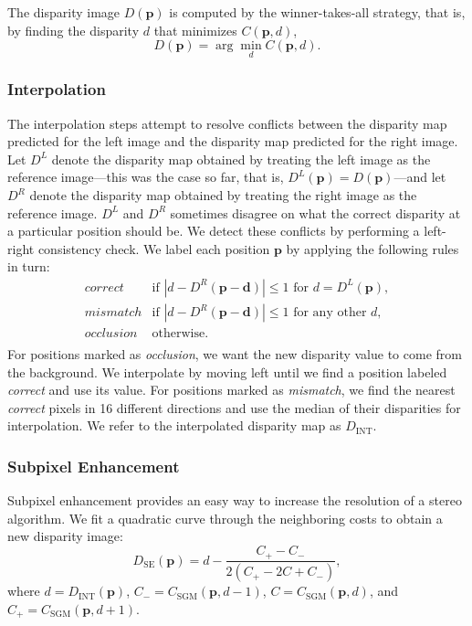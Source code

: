\documentclass[twoside,11pt]{article}
\begin{document}
The disparity image $D(\mathbf{p})$ is computed by the winner-takes-all
strategy, that is, by finding the disparity $d$ that minimizes $C(\mathbf{p},
d)$,
%
\begin{equation*}
D(\mathbf{p}) = \arg\!\min_d C(\mathbf{p}, d).
\end{equation*}

\subsubsection{Interpolation}

The interpolation steps attempt to resolve conflicts between the disparity
map predicted for the left image and the disparity map predicted for the right
image. Let $D^L$ denote the disparity map obtained by treating the left image
as the reference image---this was the case so far, that is, $D^L(\mathbf{p}) =
D(\mathbf{p})$---and let $D^R$ denote the disparity map obtained by treating
the right image as the reference image. $D^L$ and $D^R$ sometimes disagree on
what the correct disparity at a particular position should be. We detect these
conflicts by performing a left-right consistency check. We label each
position $\mathbf{p}$ by applying the following rules in turn:
%
\[ \begin{array}{ll} 
correct & \text{if $|d - D^R(\mathbf{p}-\mathbf{d})| \leq 1$ for $d = D^L(\mathbf{p})$}, \\ 
mismatch & \text{if $|d - D^R(\mathbf{p}-\mathbf{d})| \leq 1$ for any other $d$}, \\ 
occlusion & \text{otherwise}. \\ 
\end{array} \]
%
For positions marked as \emph{occlusion}, we want the new disparity value to
come from the background. We interpolate by moving left until we find a
position labeled \emph{correct} and use its value. For positions marked as
\emph{mismatch}, we find the nearest \emph{correct} pixels in 16 different
directions and use the median of their disparities for interpolation. 
We refer to the interpolated disparity map as $D_{\text{INT}}$.

\subsubsection{Subpixel Enhancement}

Subpixel enhancement provides an easy way to increase the resolution of a
stereo algorithm. We fit a quadratic curve through the neighboring costs to
obtain a new disparity image:
%
\begin{equation*}
D_{\text{SE}}(\mathbf{p}) = d - \frac {C_+ - C_-} {2 (C_+ - 2 C + C_-)},
\end{equation*}
%
where
$d = D_{\text{INT}}(\mathbf{p})$,
$C_- = C_{\text{SGM}}(\mathbf{p}, d - 1)$,
$C   = C_{\text{SGM}}(\mathbf{p}, d    )$, and
$C_+ = C_{\text{SGM}}(\mathbf{p}, d + 1)$.
\end{document}
